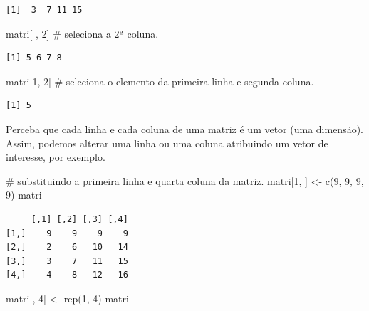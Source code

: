 \documentclass[
  letterpaper,
  DIV=11,
  numbers=noendperiod]{scrreprt}
\newenvironment{Shaded}{\begin{snugshade}}{\end{snugshade}}
\newcommand{\CommentTok}[1]{\textcolor[rgb]{0.37,0.37,0.37}{#1}}
\newcommand{\DecValTok}[1]{\textcolor[rgb]{0.68,0.00,0.00}{#1}}
\newcommand{\FunctionTok}[1]{\textcolor[rgb]{0.28,0.35,0.67}{#1}}
\newcommand{\NormalTok}[1]{\textcolor[rgb]{0.00,0.23,0.31}{#1}}
\newcommand{\OtherTok}[1]{\textcolor[rgb]{0.00,0.23,0.31}{#1}}
\begin{document}
\begin{verbatim}
[1]  3  7 11 15
\end{verbatim}

\begin{Shaded}
\begin{Highlighting}[]
\NormalTok{matri[ , }\DecValTok{2}\NormalTok{]   }\CommentTok{\# seleciona a 2ª coluna.}
\end{Highlighting}
\end{Shaded}

\begin{verbatim}
[1] 5 6 7 8
\end{verbatim}

\begin{Shaded}
\begin{Highlighting}[]
\NormalTok{matri[}\DecValTok{1}\NormalTok{, }\DecValTok{2}\NormalTok{]   }\CommentTok{\# seleciona o elemento da primeira linha e segunda coluna.}
\end{Highlighting}
\end{Shaded}

\begin{verbatim}
[1] 5
\end{verbatim}

Perceba que cada linha e cada coluna de uma matriz é um vetor (uma
dimensão). Assim, podemos alterar uma linha ou uma coluna atribuindo um
vetor de interesse, por exemplo.

\begin{Shaded}
\begin{Highlighting}[]
\CommentTok{\# substituindo a primeira linha e quarta coluna da matriz.}
\NormalTok{matri[}\DecValTok{1}\NormalTok{, ] }\OtherTok{\textless{}{-}} \FunctionTok{c}\NormalTok{(}\DecValTok{9}\NormalTok{, }\DecValTok{9}\NormalTok{, }\DecValTok{9}\NormalTok{, }\DecValTok{9}\NormalTok{)}
\NormalTok{matri}
\end{Highlighting}
\end{Shaded}

\begin{verbatim}
     [,1] [,2] [,3] [,4]
[1,]    9    9    9    9
[2,]    2    6   10   14
[3,]    3    7   11   15
[4,]    4    8   12   16
\end{verbatim}

\begin{Shaded}
\begin{Highlighting}[]
\NormalTok{matri[, }\DecValTok{4}\NormalTok{] }\OtherTok{\textless{}{-}} \FunctionTok{rep}\NormalTok{(}\DecValTok{1}\NormalTok{, }\DecValTok{4}\NormalTok{)}
\NormalTok{matri}
\end{Highlighting}
\end{Shaded}
\end{document}
